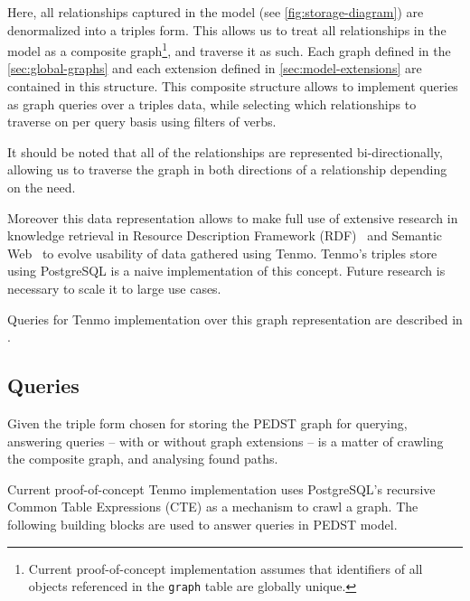 Here, all relationships captured in the model (see \cref{fig:storage-diagram}) are denormalized into a triples form. This allows us to treat all relationships in the model as a composite graph\footnote{Current proof-of-concept implementation assumes that identifiers of all objects referenced in the \texttt{graph} table are globally unique.}, and traverse it as such. Each graph defined in the \cref{sec:global-graphs} and each extension defined in \cref{sec:model-extensions} are contained in this structure. This composite structure allows to implement queries as graph queries over a triples data, while selecting which relationships to traverse on per query basis using filters of verbs.

It should be noted that all of the relationships are represented bi-directionally, allowing us to traverse the graph in both directions of a relationship depending on the need.

Moreover this data representation allows to make full use of extensive research in knowledge retrieval in Resource Description Framework (RDF)~\cite{rdf-auer2007dbpedia} and Semantic Web~\cite{rdf-shadbolt2006semantic} to evolve usability of data gathered using Tenmo. Tenmo's triples store using PostgreSQL is a naive implementation of this concept. Future research is necessary to scale it to large use cases. 

Queries for Tenmo implementation over this graph representation are described in .


\subsection{Queries}\label{sec:query-implementation}

Given the triple form chosen for storing the PEDST graph for querying, answering queries -- with or without graph extensions -- is a matter of crawling the composite graph, and analysing found paths.

Current proof-of-concept Tenmo implementation uses PostgreSQL's recursive Common Table Expressions (CTE) as a mechanism to crawl a graph. The following building blocks are used to answer queries in PEDST model.

